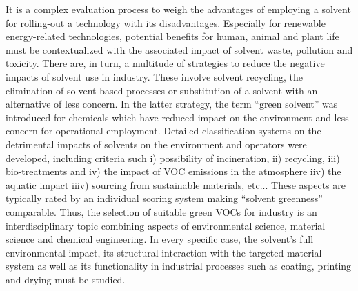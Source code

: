 \documentclass[
  english,        %
  font=times,     %
  onecolumn,      %
]{article}
\begin{document}
It is a complex evaluation process to weigh the advantages of employing a solvent for rolling-out a technology with its disadvantages\cite{wintertonGreenSolventCritical2021}. Especially for renewable energy-related technologies, potential benefits for human, animal and plant life must be contextualized with the associated impact of solvent waste, pollution and toxicity\cite{leeGreenSolventStrategies2025,zimmermannOrganicPhotovoltaicsPotential2012,vidalAssessingHealthEnvironmental2021}. There are, in turn, a multitude of strategies to reduce the negative impacts of solvent use in industry. These involve solvent recycling, the elimination of solvent-based processes or substitution of a solvent with an alternative of less concern\cite{wintertonGreenSolventCritical2021,podapangiGreenSolventsMaterials2023}. In the latter strategy, the term “green solvent” was introduced for chemicals which have reduced impact on the environment and less concern for operational employment. Detailed classification systems on the detrimental impacts of solvents on the environment and operators were developed, including criteria such i) possibility of incineration, ii) recycling, iii) bio-treatments and iv) the impact of VOC emissions in the atmosphere iiv) the aquatic impact iiiv) sourcing from sustainable materials, etc... These aspects are typically rated by an individual scoring system making “solvent greenness” comparable\cite{diorazioMoreHolisticFramework2016,capelloWhatGreenSolvent2007}. Thus, the selection of suitable green VOCs for industry is an interdisciplinary topic combining aspects of environmental science, material science and chemical engineering\cite{clarkeGreenSustainableSolvents2018,pratCHEM21SelectionGuide2016}. In every specific case, the solvent’s full environmental impact, its structural interaction with the targeted material system as well as its functionality in industrial processes such as coating, printing and drying must be studied\cite{capelloWhatGreenSolvent2007,byrneToolsTechniquesSolvent2016,clarkAlternativeSolventsShades2007}.
\end{document}
